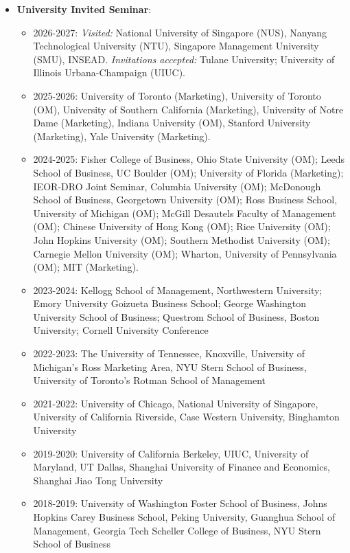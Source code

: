 \documentclass[10pt]{article}
\newenvironment{outerlist}[1][\enskip\textbullet]%
        {\begin{itemize}[#1,leftmargin=*]}{\end{itemize}%
         \vspace{-.6\baselineskip}}
\newenvironment{innerlist}[1][\enskip\textbullet]%
        {\begin{itemize}[#1,leftmargin=*,parsep=0pt,itemsep=0pt,topsep=0pt,partopsep=0pt]}
        {\end{itemize}}
\begin{document}
\begin{outerlist}

  \item {\bf University Invited Seminar}: 
    \begin{innerlist}
        \item 2026-2027: \textit{Visited:} National University of Singapore (NUS), Nanyang Technological University (NTU), Singapore Management University (SMU), INSEAD. \textit{Invitations accepted:} Tulane University; University of Illinois Urbana-Champaign (UIUC).
        \item 2025-2026: University of Toronto (Marketing), University of Toronto (OM), University of Southern California (Marketing), University of Notre Dame (Marketing), Indiana University (OM), Stanford University (Marketing), Yale University (Marketing).
        \item 2024-2025: Fisher College of Business, Ohio State University (OM); Leeds School of Business, UC Boulder (OM); University of Florida (Marketing); IEOR-DRO Joint Seminar, Columbia University (OM); McDonough School of Business, Georgetown University (OM); Ross Business School, University of Michigan (OM); McGill Desautels Faculty of Management (OM); Chinese University of Hong Kong (OM); Rice University (OM); John Hopkins University (OM); Southern Methodist University (OM); Carnegie Mellon University (OM); Wharton, University of Pennsylvania (OM); MIT (Marketing).
        \item 2023-2024: Kellogg School of Management, Northwestern University; Emory University Goizueta Business School; George Washington University School of Business; Questrom School of Business, Boston University; Cornell University Conference
        \item 2022-2023: The University of Tennessee, Knoxville, University of Michigan's Ross Marketing Area, NYU Stern School of Business, University of Toronto's Rotman School of Management
        \item 2021-2022: University of Chicago, National University of Singapore, University of California Riverside, Case Western University, Binghamton University
        \item 2019-2020: University of California Berkeley, UIUC, University of Maryland, UT Dallas, Shanghai University of Finance and Economics, Shanghai Jiao Tong University
        \item 2018-2019: University of Washington Foster School of Business, Johns Hopkins Carey Business School, Peking University, Guanghua School of Management, Georgia Tech Scheller College of Business, NYU Stern School of Business

\end{innerlist}
\end{outerlist}
\end{document}
